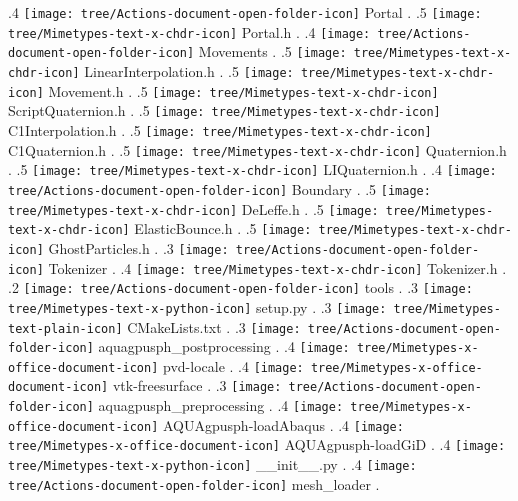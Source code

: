 {.4 { \texttt{[image: tree/Actions-document-open-folder-icon]} Portal }.
.5 { \texttt{[image: tree/Mimetypes-text-x-chdr-icon]} Portal.h }.
.4 { \texttt{[image: tree/Actions-document-open-folder-icon]} Movements }.
.5 { \texttt{[image: tree/Mimetypes-text-x-chdr-icon]} LinearInterpolation.h }.
.5 { \texttt{[image: tree/Mimetypes-text-x-chdr-icon]} Movement.h }.
.5 { \texttt{[image: tree/Mimetypes-text-x-chdr-icon]} ScriptQuaternion.h }.
.5 { \texttt{[image: tree/Mimetypes-text-x-chdr-icon]} C1Interpolation.h }.
.5 { \texttt{[image: tree/Mimetypes-text-x-chdr-icon]} C1Quaternion.h }.
.5 { \texttt{[image: tree/Mimetypes-text-x-chdr-icon]} Quaternion.h }.
.5 { \texttt{[image: tree/Mimetypes-text-x-chdr-icon]} LIQuaternion.h }.
.4 { \texttt{[image: tree/Actions-document-open-folder-icon]} Boundary }.
.5 { \texttt{[image: tree/Mimetypes-text-x-chdr-icon]} DeLeffe.h }.
.5 { \texttt{[image: tree/Mimetypes-text-x-chdr-icon]} ElasticBounce.h }.
.5 { \texttt{[image: tree/Mimetypes-text-x-chdr-icon]} GhostParticles.h }.
.3 { \texttt{[image: tree/Actions-document-open-folder-icon]} Tokenizer }.
.4 { \texttt{[image: tree/Mimetypes-text-x-chdr-icon]} Tokenizer.h }.
.2 { \texttt{[image: tree/Actions-document-open-folder-icon]} tools }.
.3 { \texttt{[image: tree/Mimetypes-text-x-python-icon]} setup.py }.
.3 { \texttt{[image: tree/Mimetypes-text-plain-icon]} CMakeLists.txt }.
.3 { \texttt{[image: tree/Actions-document-open-folder-icon]} aquagpusph\_postprocessing }.
.4 { \texttt{[image: tree/Mimetypes-x-office-document-icon]} pvd-locale }.
.4 { \texttt{[image: tree/Mimetypes-x-office-document-icon]} vtk-freesurface }.
.3 { \texttt{[image: tree/Actions-document-open-folder-icon]} aquagpusph\_preprocessing }.
.4 { \texttt{[image: tree/Mimetypes-x-office-document-icon]} AQUAgpusph-loadAbaqus }.
.4 { \texttt{[image: tree/Mimetypes-x-office-document-icon]} AQUAgpusph-loadGiD }.
.4 { \texttt{[image: tree/Mimetypes-text-x-python-icon]} \_\_init\_\_.py }.
.4 { \texttt{[image: tree/Actions-document-open-folder-icon]} mesh\_loader }.
}
